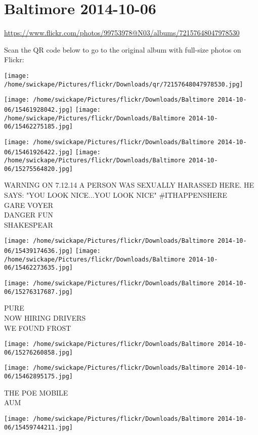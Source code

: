 \documentclass[10pt,letterpaper]{article}
\begin{document}
\section*{Baltimore 2014-10-06}

\url{https://www.flickr.com/photos/99753978@N03/albums/72157648047978530}

Scan the QR code below to go to the original album with full-size photos on Flickr:

\texttt{[image: /home/swickape/Pictures/flickr/Downloads/qr/72157648047978530.jpg]}
\pagebreak

\texttt{[image: /home/swickape/Pictures/flickr/Downloads/Baltimore 2014-10-06/15461928042.jpg]}
\texttt{[image: /home/swickape/Pictures/flickr/Downloads/Baltimore 2014-10-06/15462275185.jpg]}

\texttt{[image: /home/swickape/Pictures/flickr/Downloads/Baltimore 2014-10-06/15461926422.jpg]}
\texttt{[image: /home/swickape/Pictures/flickr/Downloads/Baltimore 2014-10-06/15275564820.jpg]}

WARNING ON 7.12.14 A PERSON WAS SEXUALLY HARASSED HERE.  HE SAYS: "YOU LOOK NICE...YOU LOOK NICE" \#ITHAPPENSHERE\\
GARE VOYER\\
DANGER FUN\\
SHAKESPEAR
\pagebreak

\texttt{[image: /home/swickape/Pictures/flickr/Downloads/Baltimore 2014-10-06/15439174636.jpg]}
\texttt{[image: /home/swickape/Pictures/flickr/Downloads/Baltimore 2014-10-06/15462273635.jpg]}

\texttt{[image: /home/swickape/Pictures/flickr/Downloads/Baltimore 2014-10-06/15276317687.jpg]}

PURE\\
NOW HIRING DRIVERS\\
WE FOUND FROST
\pagebreak

\texttt{[image: /home/swickape/Pictures/flickr/Downloads/Baltimore 2014-10-06/15276260858.jpg]}

\vspace{0.25in}
\texttt{[image: /home/swickape/Pictures/flickr/Downloads/Baltimore 2014-10-06/15462895175.jpg]}

THE POE MOBILE\\
AUM
\pagebreak

\texttt{[image: /home/swickape/Pictures/flickr/Downloads/Baltimore 2014-10-06/15459744211.jpg]}
\end{document}
